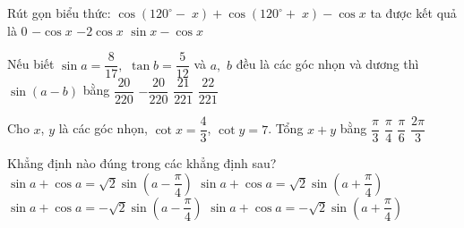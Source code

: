 \begin{ex}%
	Rút gọn biểu thức: $\cos \left(120^{\circ}-\; x\right)+\cos \left(120^{\circ}+\; x\right)-\cos x$ ta được kết  quả là
	 \choice
		{$0$} 
		 {$-\cos x$}
		{\True $-2\cos  x$}
		 {$\sin x-\cos x$}
\end{ex}

\begin{ex}%
	Nếu biết $\sin a=\dfrac{8}{17},$ $\tan b=\dfrac{5}{12}$  và $a,$ $b$ đều là các góc nhọn và dương thì $\sin \left(a-b\right)$ bằng
	\choice 
		 {$\dfrac{20}{220}$}
		{$-\dfrac{20}{220}$} 
		{\True  $\dfrac{21}{221}$}
		{$\dfrac{22}{221}$} 
\end{ex}

\begin{ex}%
	Cho $x$, $y$ là các  góc nhọn, $\cot x=\dfrac{4}{3}$, $\cot y=7$. Tổng $x+y$ bằng
	 \choice
		 {$\dfrac{\pi}{3}$}
		{\True  $\dfrac{\pi}{4}$}
		 {$\dfrac{\pi}{6}$}
		 {$\dfrac{2\pi}{3}$}
\end{ex}

\begin{ex}%
	Khẳng định nào đúng trong  các khẳng định sau?
	\choice 
		{$\sin a + \cos a = \sqrt{2}  \sin \left(a - \dfrac{\pi}{4}\right)$}
		{\True $\sin a + \cos a = \sqrt{2} \sin \left(a  + \dfrac{\pi}{4}\right)$}
		{$\sin a  + \cos a = -\sqrt{2} \sin \left(a - \dfrac{\pi}{4}\right)$}
		{$\sin a + \cos a = -\sqrt{2} \sin \left(a + \dfrac{\pi}{4}\right)$} 
\end{ex}

